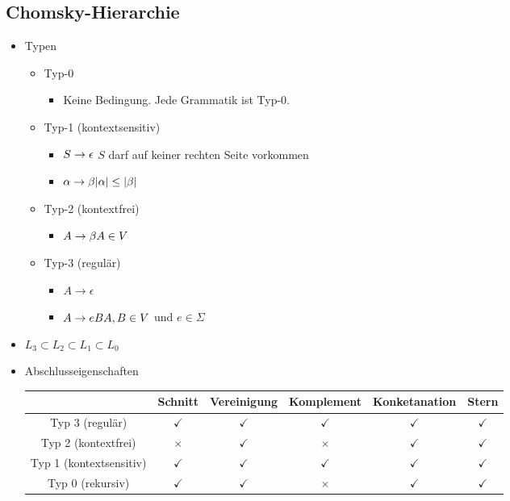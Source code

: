 \documentclass{scrartcl}
\begin{document}
\subsection{Chomsky-Hierarchie}

\begin{itemize}
	\item Typen
	\begin{itemize}
		\item Typ-0
		\begin{itemize}
			\item Keine Bedingung. Jede Grammatik ist Typ-0.
		\end{itemize}
		\item Typ-1 (kontextsensitiv)
		\begin{itemize}
			\item $S \rightarrow \epsilon \hfill$ $S$ darf auf keiner rechten Seite vorkommen
			\item $\alpha \rightarrow \beta \hfill |\alpha| \leq |\beta|$
		\end{itemize}
		\item Typ-2 (kontextfrei)
		\begin{itemize}
			\item $A \rightarrow \beta \hfill A \in V$
		\end{itemize}
		\item Typ-3 (regulär)
		\begin{itemize}
				\item $A \rightarrow \epsilon$
		\item $A \rightarrow eB \hfill A,B \in V$ und $e \in \Sigma$
		\end{itemize}	
	\end{itemize}
	\item $L_3 \subset L_2 \subset L_1 \subset L_0$
	\item Abschlusseigenschaften \\
	\renewcommand{\arraystretch}{1.2}
	\begin{tabular}{|c|c|c|c|c|c|}
		\hline 
		& Schnitt & Vereinigung & Komplement & Konketanation & Stern \\ 
		\hline 
		Typ 3 (regulär) & $\checkmark$ & $\checkmark$ & $\checkmark$ & $\checkmark$ & $\checkmark$ \\ 
		\hline 
		Typ 2 (kontextfrei) & $\times$ & $\checkmark$ & $\times$ & $\checkmark$ & $\checkmark$ \\ 
		\hline 
		Typ 1 (kontextsensitiv) & $\checkmark$ & $\checkmark$ & $\checkmark$ & $\checkmark$ & $\checkmark$ \\ 
		\hline 
		Typ 0 (rekursiv) & $\checkmark$ & $\checkmark$ & $\times$ & $\checkmark$ & $\checkmark$ \\ 
		\hline 
	\end{tabular} 
\end{itemize}
\end{document}
